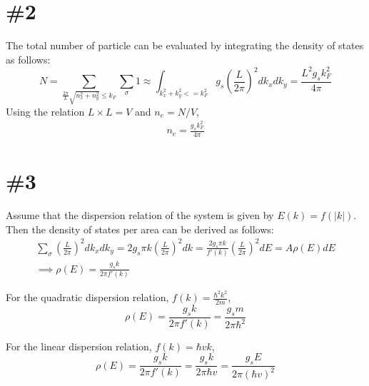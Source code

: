 \documentclass[a4paper,11pt]{article}
\begin{document}
\section{\#2}

The total number of particle can be evaluated by integrating the density of states as follows:
\begin{equation}
    N = \sum_{\frac{2\pi}{L}\sqrt{n_x^2 + n_y^2} \le k_F} \sum_{\sigma} 1 \approx \int_{k_x^2 + k_y^2 <= k_F^2} g_s\left(\frac{L}{2\pi}\right)^2 dk_x dk_y = \frac{L^2 g_s k_F^2}{4\pi}
\end{equation}
Using the relation $L\times L = V$ and $n_e = N/V$, 
\begin{eqnarray}
    n_e = \frac{g_s k_F^2}{4\pi}
\end{eqnarray}


\section{\#3}

Assume that the dispersion relation of the system is given by $E(k) = f(|k|)$. Then the density of states per area can be derived as follows:
\begin{gather}
    \sum_{\sigma} \left(\frac{L}{2\pi}\right)^2 dk_x dk_y = 2g_s\pi k \left(\frac{L}{2\pi}\right)^2dk = \frac{2g_s\pi k}{f'(k)} \left(\frac{L}{2\pi}\right)^2 dE = A\rho(E) dE \\
    \implies \rho(E) = \frac{g_s k}{2\pi f'(k)}
\end{gather}


For the quadratic dispersion relation, $f(k) = \frac{\hbar^2 k^2}{2m}$,
\begin{equation}
    \rho(E) = \frac{g_s k}{2\pi f'(k)} = \frac{g_s m}{2\pi \hbar^2}
\end{equation}


For the linear dispersion relation, $f(k) = \hbar v k$,
\begin{equation}
    \rho(E) = \frac{g_s k}{2\pi f'(k)} = \frac{g_s k }{2\pi \hbar v} = \frac{g_s E}{2\pi (\hbar v)^2}
\end{equation}
\end{document}
